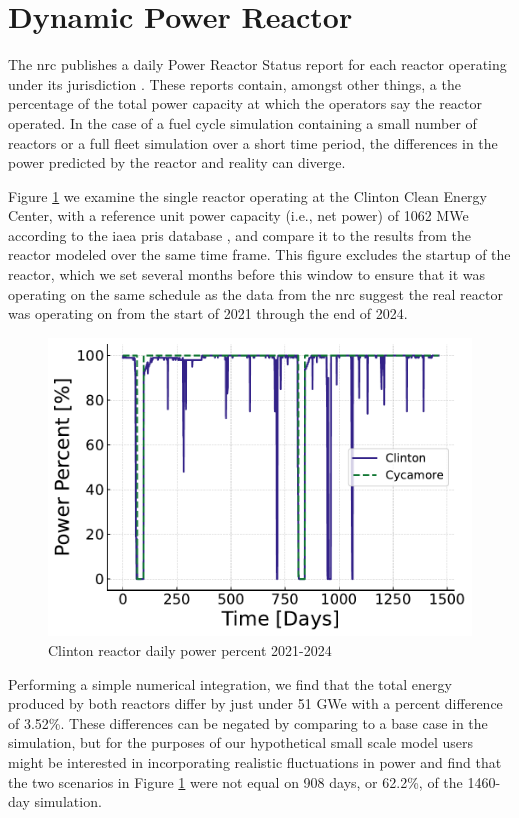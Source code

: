 \section{Dynamic Power Reactor}
\label{sec:dpr_method}

The \gls{nrc} publishes a daily Power Reactor Status report for each reactor operating under its jurisdiction \cite{nrc_power_2025}. These reports contain, amongst other things, a the percentage of the total power capacity at which the operators say the reactor operated. In the case of a fuel cycle simulation containing a small number of reactors or a full fleet simulation over a short time period, the differences in the power predicted by the \cycamore reactor and reality can diverge.

Figure \ref{fig:pp_full} we examine the single reactor operating at the Clinton Clean Energy Center, with a reference unit power capacity (i.e., net power) of 1062 MWe according to the \gls{iaea} \gls{pris} database \cite{IAEA_PRIS}, and compare it to the results from the \cycamore reactor modeled over the same time frame. This figure excludes the startup of the \cycamore reactor, which we set several months before this window to ensure that it was operating on the same schedule as the data from the \gls{nrc} suggest the real reactor was operating on from the start of 2021 through the end of 2024.

\begin{figure}
  \centering
  \includegraphics[scale=0.7]{images/power_reactor/power_percent_clinton_fake.pdf}
  \caption{Clinton reactor daily power percent 2021-2024}
  \label{fig:pp_full}
\end{figure}

Performing a simple numerical integration, we find that the total energy produced by both reactors differ by just under 51 GWe with a percent difference of 3.52\%. These differences can be negated by comparing to a base case in the simulation, but for the purposes of our hypothetical small scale model users might be interested in incorporating realistic fluctuations in power and find that the two scenarios in Figure \ref{fig:pp_full} were not equal on 908 days, or 62.2\%, of the 1460-day simulation.

